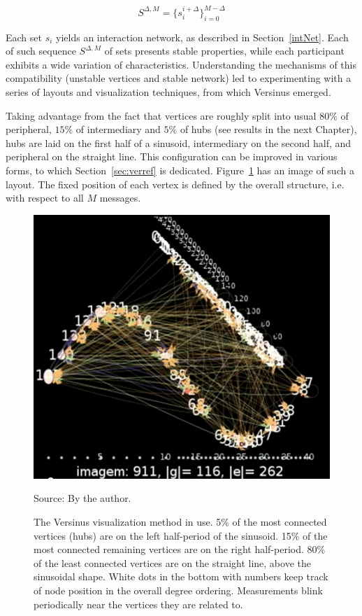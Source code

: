 \begin{equation}
S^{\Delta,M}=\{s_i^{i+\Delta}\}_{i=0}^{M-\Delta}
\end{equation}

Each set $s_i$ yields an interaction network, as described in Section~\ref{intNet}.
Each of such sequence $S^{\Delta,M}$ of sets presents stable properties,
while each participant exhibits a wide variation of characteristics.
Understanding the mechanisms of this compatibility (unstable vertices and stable network)
led to experimenting with a series of layouts and visualization techniques, from which Versinus emerged.

Taking advantage from the fact that vertices are roughly split into usual $80\%$ of peripheral, $15\%$ of intermediary and $5\%$ of hubs (see results in the next Chapter),
hubs are laid on the first half of a sinusoid,
intermediary on the second half,
and peripheral on the straight line.
This configuration can be improved in various forms, to which Section~\ref{sec:verref} is dedicated.
Figure~\ref{fig:versinus} has an image of such a layout.
The fixed position of each vertex is defined by the overall structure,
i.e. with respect to all $M$ messages.

\begin{figure}[h!]
\begin{center}
\caption{The Versinus visualization method in use. 5\% of the most connected vertices (hubs) are on the left half-period of the sinusoid.
15\% of the most connected remaining vertices are on the right half-period.
80\% of the least connected vertices are on the straight line, above the sinusoidal shape.
White dots in the bottom with numbers keep track of node position in the overall degree ordering.
Measurements blink periodically near the vertices they are related to.}
\includegraphics[scale=.45]{figs/versinus_}
\label{fig:versinus}
\begin{flushleft}\footnotesize
Source: By the author.\
\end{flushleft}
\end{center}
\end{figure}


